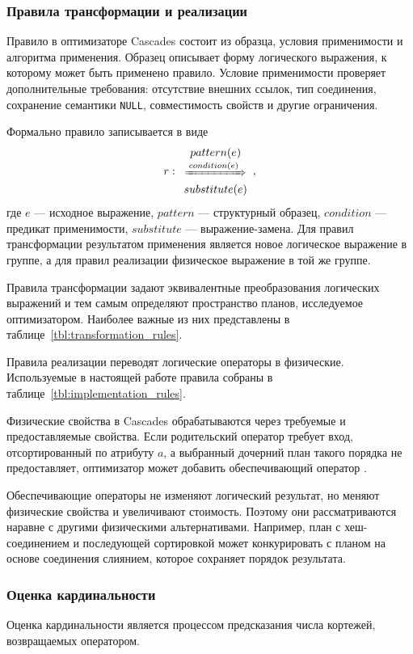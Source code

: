 \documentclass[14pt, russian]{scrartcl}
\begin{document}
\subsubsection{Правила трансформации и реализации}\label{sec:transformation_rules}

Правило в оптимизаторе Cascades состоит из образца, условия применимости и
алгоритма применения. Образец описывает форму логического выражения, к которому
может быть применено правило. Условие применимости проверяет дополнительные
требования: отсутствие внешних ссылок, тип соединения, сохранение семантики
\texttt{NULL}, совместимость свойств и другие ограничения.

Формально правило записывается в виде
\[
    r : \TransRule{pattern(e)}{condition(e)}{substitute(e)},
\]
\noindent{} где \(e\) --- исходное выражение, \(pattern\) --- структурный образец,
\(condition\) --- предикат применимости, \(substitute\) --- выражение-замена.
Для правил трансформации результатом применения является новое логическое
выражение в группе, а для правил реализации физическое выражение в той же
группе.

Правила трансформации задают эквивалентные преобразования логических выражений и
тем самым определяют пространство планов, исследуемое оптимизатором. Наиболее
важные из них представлены в таблице~\ref{tbl:transformation_rules}.

Правила реализации переводят логические операторы в физические. Используемые в
настоящей работе правила собраны в таблице~\ref{tbl:implementation_rules}.

Физические свойства в Cascades обрабатываются через требуемые и предоставляемые
свойства. Если родительский оператор требует вход, отсортированный по атрибуту
\(a\), а выбранный дочерний план такого порядка не предоставляет, оптимизатор
может добавить обеспечивающий оператор \Sort.

Обеспечивающие операторы не изменяют логический результат, но меняют физические
свойства и увеличивают стоимость. Поэтому они рассматриваются наравне с другими
физическими альтернативами. Например, план с хеш-соединением и последующей
сортировкой может конкурировать с планом на основе соединения слиянием, которое
сохраняет порядок результата.

\subsubsection{Оценка кардинальности}

Оценка кардинальности является процессом предсказания числа кортежей,
возвращаемых оператором.
\end{document}
